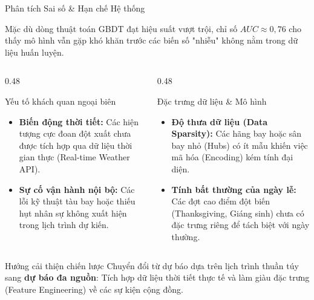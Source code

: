 \begin{frame}{Phân tích Sai số \& Hạn chế Hệ thống}
  \begin{small}
  Mặc dù dòng thuật toán GBDT đạt hiệu suất vượt trội, chỉ số $AUC \approx 0{,}76$ cho thấy mô hình vẫn gặp khó khăn trước các biến số "nhiễu" không nằm trong dữ liệu huấn luyện.
  
  \begin{columns}[T,onlytextwidth]
  \begin{column}{0.48\textwidth}
  \begin{block}{Yếu tố khách quan ngoại biên}
  \begin{itemize}
    \item \textbf{Biến động thời tiết:} Các hiện tượng cực đoan đột xuất chưa được tích hợp qua dữ liệu thời gian thực (Real-time Weather API).
    \item \textbf{Sự cố vận hành nội bộ:} Các lỗi kỹ thuật tàu bay hoặc thiếu hụt nhân sự không xuất hiện trong lịch trình dự kiến.
  \end{itemize}
  \end{block}
  \end{column}
  
  \begin{column}{0.48\textwidth}
  \begin{block}{Đặc trưng dữ liệu \& Mô hình}
  \begin{itemize}
    \item \textbf{Độ thưa dữ liệu (Data Sparsity):} Các hãng bay hoặc sân bay nhỏ (Hubs) có ít mẫu khiến việc mã hóa (Encoding) kém tính đại diện.
    \item \textbf{Tính bất thường của ngày lễ:} Các đợt cao điểm đột biến (Thanksgiving, Giáng sinh) chưa có đặc trưng riêng để tách biệt với ngày thường.
  \end{itemize}
  \end{block}
  \end{column}
  \end{columns}
  
  \vspace{3mm}
  \begin{alertblock}{Hướng cải thiện chiến lược}
  Chuyển đổi từ dự báo dựa trên lịch trình thuần túy sang \textbf{dự báo đa nguồn}: Tích hợp dữ liệu thời tiết thực tế và làm giàu đặc trưng (Feature Engineering) về các sự kiện cộng đồng.
  \end{alertblock}
  \end{small}
\end{frame}
